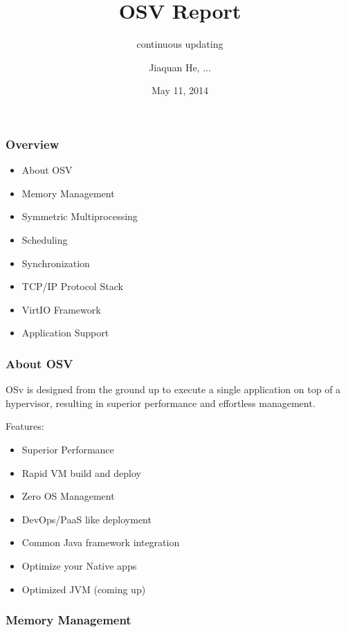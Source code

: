 \documentclass[10pt]{beamer}
\title{OSV Report}
\subtitle{continuous updating}
\author[Jiaquan He, ...]{Jiaquan He, ...}
\institute[THCSOS]{
	THCSOS
}
\date{May 11, 2014}
\begin{document}
\begin{frame}[plain]
	\titlepage
\end{frame}


\begin{frame}
	\frametitle{Overview}

\begin{itemize}
	\item About OSV
	\item Memory Management
	\item Symmetric Multiprocessing
	\item Scheduling
	\item Synchronization
	\item TCP/IP Protocol Stack
	\item VirtIO Framework
	\item Application Support
\end{itemize}

\end{frame}


\begin{frame}
	\frametitle{About OSV}

	OSv is designed from the ground up to execute a single application on top of a hypervisor, resulting in superior performance and effortless management.

	\bigskip
	\pause

	Features: 
	\begin{itemize}
		\item Superior Performance
		\item Rapid VM build and deploy
		\item Zero OS Management
		\item DevOps/PaaS like deployment
		\item Common Java framework integration
		\item Optimize your Native apps
		\item Optimized JVM (coming up)
	\end{itemize}

\end{frame}

\begin{frame}
	\frametitle{Memory Management}
  
\end{frame}
\end{document}
